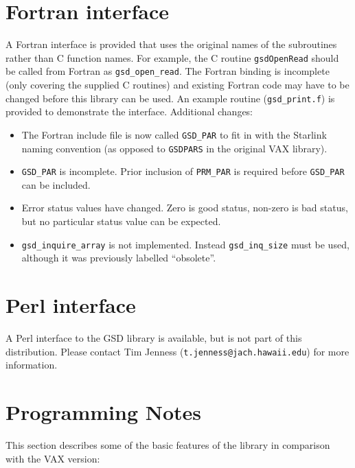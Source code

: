 \documentclass[oneside,11pt]{starlink}
\begin{document}
\section{Fortran interface}

A Fortran interface is provided that uses the original names of the
subroutines rather than C function names. For example, the C routine
\texttt{gsdOpenRead} should be called from Fortran as \texttt{gsd\_open\_read}.
The Fortran binding is incomplete (only covering the supplied C routines) and
existing Fortran code may have to be changed before this library can be
used. An example routine (\texttt{gsd\_print.f}) is provided to demonstrate
the interface. Additional changes:

\begin{itemize}
\item The Fortran include file is now called \texttt{GSD\_PAR} to fit in with
the Starlink naming convention (as opposed to \texttt{GSDPARS} in the original
VAX library).

\item \texttt{GSD\_PAR} is incomplete. Prior inclusion of \texttt{PRM\_PAR}
is required before \texttt{GSD\_PAR} can be included.

\item Error status values have changed. Zero is good status, non-zero is
   bad status, but no particular status value can be expected.

\item \texttt{gsd\_inquire\_array} is not implemented. Instead
\texttt{gsd\_inq\_size} must be used, although it was previously labelled
``obsolete''.

\end{itemize}

\section{Perl interface}

A Perl interface to the GSD library is available, but is not part of this
distribution. Please contact Tim Jenness (\texttt{t.jenness@jach.hawaii.edu})
for more information.

\section{Programming Notes}

This section describes some of the basic features of the library in
comparison with the VAX version:
\end{document}
